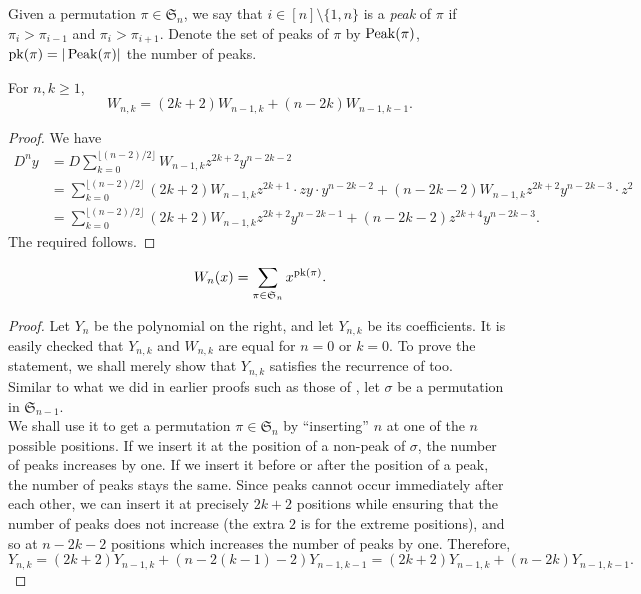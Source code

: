 	\begin{fdef}[Peak]
		Given a permutation $\pi \in \mathfrak{S}_n$, we say that $i \in [n] \setminus \{1,n\}$ is a \emph{peak} of $\pi$ if $\pi_i > \pi_{i-1}$ and $\pi_i > \pi_{i+1}$. Denote the set of peaks of $\pi$ by $\operatorname{Peak}(\pi)$, $\operatorname{pk}(\pi) = |\operatorname{Peak}(\pi)|$ the number of peaks.
	\end{fdef}

	\begin{lemma}
		\label{lem: Wnk recurrence}
		For $n,k \ge 1$,
		\[ W_{n,k} = (2k+2) W_{n-1,k} + (n-2k) W_{n-1,k-1}. \]
	\end{lemma}
	\begin{proof}
		We have
		\begin{align*}
			D^{n}y &= D \sum_{k=0}^{\lfloor (n-2)/2 \rfloor} W_{n-1,k} z^{2k+2} y^{n-2k-2} \\
				&= \sum_{k=0}^{\lfloor (n-2)/2 \rfloor} (2k+2) W_{n-1,k} z^{2k+1} \cdot zy \cdot y^{n-2k-2} + (n-2k-2) W_{n-1,k} z^{2k+2} y^{n-2k-3} \cdot z^2 \\
				&= \sum_{k=0}^{\lfloor (n-2)/2 \rfloor} (2k+2) W_{n-1,k} z^{2k+2} y^{n-2k-1} + (n-2k-2) z^{2k+4} y^{n-2k-3}.
		\end{align*}
		The required follows.
	\end{proof}

	\begin{ftheo}
		\[ W_n(x) = \sum_{\pi \in \mathfrak{S}_n} x^{\operatorname{pk}(\pi)}. \]
	\end{ftheo}
	\begin{proof}
		Let $Y_n$ be the polynomial on the right, and let $Y_{n,k}$ be its coefficients. It is easily checked that $Y_{n,k}$ and $W_{n,k}$ are equal for $n=0$ or $k=0$. To prove the statement, we shall merely show that $Y_{n,k}$ satisfies the recurrence of  too.\\
		Similar to what we did in earlier proofs such as those of , let $\sigma$ be a permutation in $\mathfrak{S}_{n-1}$.\\ We shall use it to get a permutation $\pi \in \mathfrak{S}_n$ by ``inserting'' $n$ at one of the $n$ possible positions. If we insert it at the position of a non-peak of $\sigma$, the number of peaks increases by one. If we insert it before or after the position of a peak, the number of peaks stays the same. Since peaks cannot occur immediately after each other, we can insert it at precisely $2k+2$ positions while ensuring that the number of peaks does not increase (the extra $2$ is for the extreme positions), and so at $n-2k-2$ positions which increases the number of peaks by one. Therefore,
		\[ Y_{n,k} = (2k+2)Y_{n-1,k} + (n-2(k-1)-2)Y_{n-1,k-1} = (2k+2) Y_{n-1,k} + (n-2k)Y_{n-1,k-1}. \]
	\end{proof}

